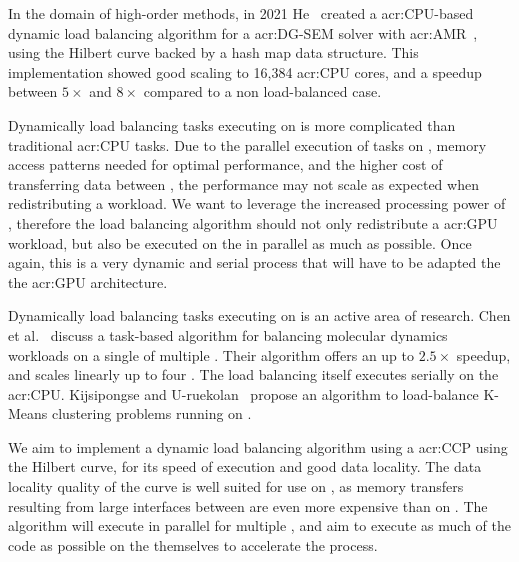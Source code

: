 In the domain of high-order methods, in 2021 He~\cite{He2021} created a \acrshort{acr:CPU}-based
dynamic load balancing algorithm for a \acrshort{acr:DG-SEM} solver with
\acrshort{acr:AMR}~\cite{He2021}, using the Hilbert curve backed by a hash map data structure. This
implementation showed good scaling to 16,384 \acrshort{acr:CPU} cores, and a speedup between \(5
\times \) and \(8 \times \) compared to a non load-balanced case.

Dynamically load balancing tasks executing on  is more complicated than
traditional \acrshort{acr:CPU} tasks. Due to the parallel execution of tasks on
, memory access patterns needed for optimal performance, and the higher cost of
transferring data between , the performance may not scale as expected when
redistributing a workload. We want to leverage the increased processing power of
, therefore the load balancing algorithm should not only redistribute a
\acrshort{acr:GPU} workload, but also be executed on the  in parallel as much as
possible. Once again, this is a very dynamic and serial process that will have to be adapted the the
\acrshort{acr:GPU} architecture.

Dynamically load balancing tasks executing on  is an active area of research.
Chen et al.~\cite{Chen2010} discuss a task-based algorithm for balancing molecular dynamics
workloads on a single of multiple . Their algorithm offers an up to \(2.5 \times
\) speedup, and scales linearly up to four . The load balancing itself executes
serially on the \acrshort{acr:CPU}. Kijsipongse and U-ruekolan~\cite{Kijsipongse2012} propose an
algorithm to load-balance K-Means clustering problems running on .

We aim to implement a dynamic load balancing algorithm using a \acrshort{acr:CCP} using the Hilbert
curve, for its speed of execution and good data locality. The data locality quality of the curve is
well suited for use on , as memory transfers resulting from large interfaces
between  are even more expensive than on . The algorithm
will execute in parallel for multiple , and aim to execute as much of the code
as possible on the  themselves to accelerate the process.
